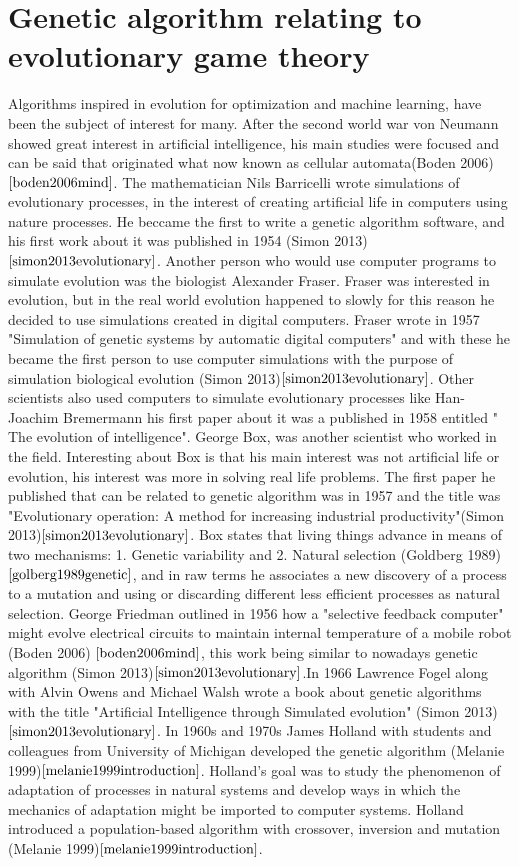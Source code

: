 \documentclass{article}
\begin{document}
\section{Genetic algorithm relating to evolutionary game theory}
Algorithms inspired in evolution for optimization and machine learning, have been the subject of interest for many. After the second world war von Neumann showed great interest in artificial intelligence, his main studies were focused and can be said that originated what now known as cellular automata(Boden 2006) $\cite{boden2006mind}$. The mathematician Nils Barricelli wrote simulations of evolutionary processes, in the interest of creating artificial life in computers using nature processes. He beccame the first to write a genetic algorithm software, and his first work about it was published in 1954 (Simon 2013)$\cite{simon2013evolutionary}$. Another person who would use computer programs to simulate evolution was the biologist Alexander Fraser. Fraser was interested in evolution, but in the real world evolution happened to slowly for this reason he decided to use simulations created in digital computers. Fraser wrote in 1957 "Simulation of genetic systems by automatic digital computers" and with these he became the first person to use computer simulations with the purpose of simulation biological evolution (Simon 2013)$\cite{simon2013evolutionary}$.  Other scientists also used computers to simulate evolutionary processes like Han-Joachim Bremermann his first paper  about it was a published in 1958 entitled " The evolution of intelligence".  George Box, was another scientist who worked in the field. Interesting about Box is that his main interest was not artificial life or evolution, his interest was more in solving real life problems. The first paper he published that can be related to genetic algorithm was in 1957 and the title was "Evolutionary operation: A method for increasing industrial productivity"(Simon 2013)$\cite{simon2013evolutionary}$. Box states that living things advance in means of two mechanisms: 1. Genetic variability and 2. Natural selection (Goldberg 1989)$\cite{golberg1989genetic}$, and in raw terms he associates a new discovery of a process to a mutation and using or discarding different less efficient processes as natural selection. George Friedman outlined in 1956 how a "selective feedback computer" might evolve electrical circuits to maintain internal temperature of a mobile robot (Boden 2006) $\cite{boden2006mind}$, this work being similar to nowadays genetic algorithm (Simon 2013)$\cite{simon2013evolutionary}$.In 1966 Lawrence Fogel along with Alvin Owens and Michael Walsh wrote a book about genetic algorithms with the title "Artificial Intelligence through Simulated evolution" (Simon 2013)$\cite{simon2013evolutionary}$.  In 1960s and 1970s James Holland with students and colleagues from University of Michigan developed the genetic algorithm (Melanie 1999)$\cite{melanie1999introduction}$. Holland's goal was to study the phenomenon of adaptation of processes in natural systems and develop ways in which the mechanics of adaptation might be imported to computer systems. Holland introduced a population-based algorithm with crossover, inversion and mutation (Melanie 1999)$\cite{melanie1999introduction}$.
\end{document}
